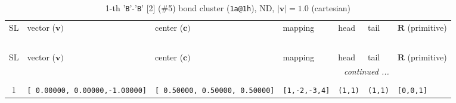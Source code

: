 \documentclass[fleqn,10pt,landscape]{jsarticle}
\begin{document}
\renewcommand{\arraystretch}{1.6}
\begin{longtable}[l]{cllllll}
\captionsetup{justification=raggedright, singlelinecheck=off}
\caption{1-th '\texttt{B}'-'\texttt{B}' [2] (\#5) bond cluster (\texttt{1a@1h}), ND, $|\bm{v}|=1.0$ (cartesian)}
 \\
 \hline \hline
SL & vector ($\bm{v})$ & center ($\bm{c})$ & mapping & head & tail & $\bm{R}$ (primitive) \\ \hline \endfirsthead

\multicolumn{6}{l}{\tablename\ \thetable{}} \\
 \hline \hline
SL & vector ($\bm{v})$ & center ($\bm{c})$ & mapping & head & tail & $\bm{R}$ (primitive) \\ \hline \endhead

 \hline \hline
\multicolumn{6}{r}{\footnotesize\it continued ...} \\ \endfoot

 \hline \hline
\multicolumn{6}{r}{} \\ \endlastfoot

1 & \texttt{[ 0.00000, 0.00000,-1.00000]} & \texttt{[ 0.50000, 0.50000, 0.50000]} & \texttt{[1,-2,-3,4]} & \texttt{(1,1)} & \texttt{(1,1)} & \texttt{[0,0,1]} \\
\end{longtable}
\end{document}
